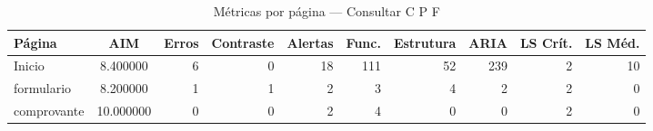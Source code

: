 \begin{table}[htbp]
  \centering
  \caption{Métricas por página — Consultar C P F}
  \label{tab:flow_consultar_c_p_f}
  \small
  \begin{tabular}{lcrrrrrrrr}
\toprule
Página & AIM & Erros & Contraste & Alertas & Func. & Estrutura & ARIA & LS Crít. & LS Méd. \\
\midrule
Inicio & 8.400000 & 6 & 0 & 18 & 111 & 52 & 239 & 2 & 10 \\
formulario & 8.200000 & 1 & 1 & 2 & 3 & 4 & 2 & 2 & 0 \\
comprovante & 10.000000 & 0 & 0 & 2 & 4 & 0 & 0 & 2 & 0 \\
\bottomrule
\end{tabular}
\end{table}
